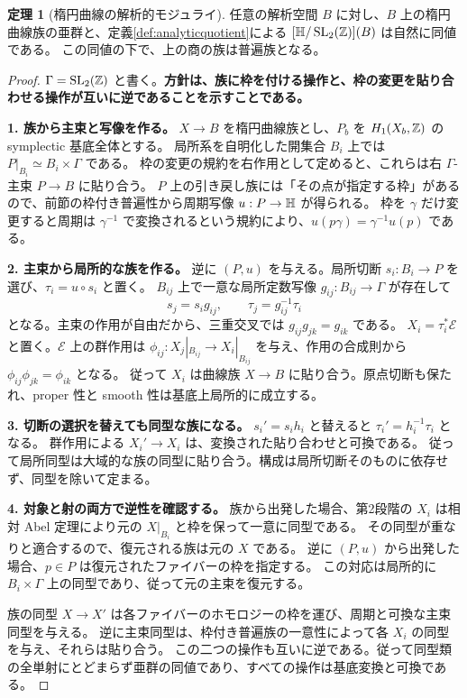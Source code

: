 \documentclass[dvipdfmx,a4paper,11pt]{article}
\theoremstyle{definition}
\newtheorem{thm}{定理}[section]
\DeclareMathOperator{\SL}{SL}\DeclareMathOperator{\PGL}{PGL}\DeclareMathOperator{\PSL}{PSL}
\begin{document}
\begin{thm}[楕円曲線の解析的モジュライ]\label{thm:ellstack}
任意の解析空間 $B$ に対し、$B$ 上の楕円曲線族の亜群と、定義\ref{def:analyticquotient}による $[\HH/\SL_2(\Z)](B)$ は自然に同値である。
この同値の下で、上の商の族は普遍族となる。
\end{thm}
\begin{proof}
$\Gamma=\SL_2(\Z)$ と書く。\textbf{方針は、族に枠を付ける操作と、枠の変更を貼り合わせる操作が互いに逆であることを示すことである。}

\textbf{1. 族から主束と写像を作る。}
$X\to B$ を楕円曲線族とし、$P_b$ を $H_1(X_b,\mathbb Z)$ の symplectic 基底全体とする。
局所系を自明化した開集合 $B_i$ 上では $P|_{B_i}\simeq B_i\times\Gamma$ である。
枠の変更の規約を右作用として定めると、これらは右 $\Gamma$-主束 $P\to B$ に貼り合う。
$P$ 上の引き戻し族には「その点が指定する枠」があるので、前節の枠付き普遍性から周期写像 $u:P\to\mathbb H$ が得られる。
枠を $\gamma$ だけ変更すると周期は $\gamma^{-1}$ で変換されるという規約により、$u(p\gamma)=\gamma^{-1}u(p)$ である。

\textbf{2. 主束から局所的な族を作る。}
逆に $(P,u)$ を与える。局所切断 $s_i:B_i\to P$ を選び、$\tau_i=u\circ s_i$ と置く。
$B_{ij}$ 上で一意な局所定数写像 $g_{ij}:B_{ij}\to\Gamma$ が存在して
\[
s_j=s_i g_{ij},\qquad \tau_j=g_{ij}^{-1}\tau_i
\]
となる。主束の作用が自由だから、三重交叉では $g_{ij}g_{jk}=g_{ik}$ である。
$X_i=\tau_i^*\mathscr E$ と置く。$\mathscr E$ 上の群作用は
$\phi_{ij}:X_j|_{B_{ij}}\to X_i|_{B_{ij}}$ を与え、作用の合成則から
$\phi_{ij}\phi_{jk}=\phi_{ik}$ となる。
従って $X_i$ は曲線族 $X\to B$ に貼り合う。原点切断も保たれ、proper 性と smooth 性は基底上局所的に成立する。

\textbf{3. 切断の選択を替えても同型な族になる。}
$s_i'=s_i h_i$ と替えると $\tau_i'=h_i^{-1}\tau_i$ となる。
群作用による $X_i'\to X_i$ は、変換された貼り合わせと可換である。
従って局所同型は大域的な族の同型に貼り合う。構成は局所切断そのものに依存せず、同型を除いて定まる。

\textbf{4. 対象と射の両方で逆性を確認する。}
族から出発した場合、第2段階の $X_i$ は相対 Abel 定理により元の $X|_{B_i}$ と枠を保って一意に同型である。
その同型が重なりと適合するので、復元される族は元の $X$ である。
逆に $(P,u)$ から出発した場合、$p\in P$ は復元されたファイバーの枠を指定する。
この対応は局所的に $B_i\times\Gamma$ 上の同型であり、従って元の主束を復元する。

族の同型 $X\to X'$ は各ファイバーのホモロジーの枠を運び、周期と可換な主束同型を与える。
逆に主束同型は、枠付き普遍族の一意性によって各 $X_i$ の同型を与え、それらは貼り合う。
この二つの操作も互いに逆である。従って同型類の全単射にとどまらず亜群の同値であり、すべての操作は基底変換と可換である。
\end{proof}
\end{document}
